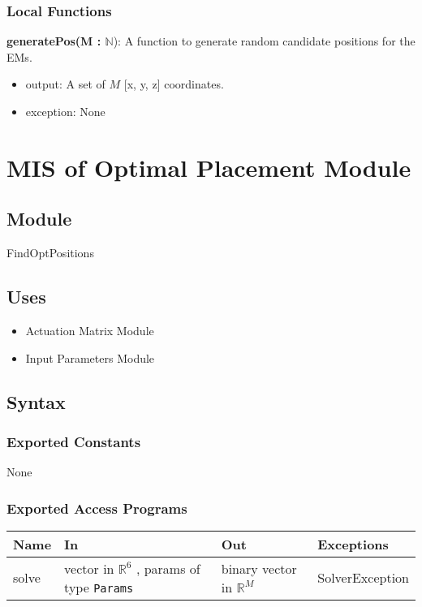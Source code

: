 \documentclass[12pt, titlepage]{article}
\begin{document}
\subsubsection{Local Functions}
\textbf{generatePos(M : $\mathbb{N}$}): A function to generate random candidate positions for the EMs. 
\begin{itemize}
  \item output: A set of $M$ [x, y, z] coordinates. 
  \item exception: None
\end{itemize}

\newpage


\section{MIS of Optimal Placement Module} \label{MISOptPlacement}

\subsection{Module}
FindOptPositions

\subsection{Uses}
\begin{itemize}
  \item Actuation Matrix Module 
  \item Input Parameters Module
\end{itemize}

\subsection{Syntax}

\subsubsection{Exported Constants}
None

\subsubsection{Exported Access Programs}

\begin{center}
  \begin{tabular}{p{3cm} p{4cm} p{4cm} p{3cm}}
  \hline
  \textbf{Name} & \textbf{In} & \textbf{Out} & \textbf{Exceptions} \\
  \hline
  solve & vector in $\mathbb{R}^6$ , params of type \texttt{Params} & binary vector in $\mathbb{R}^M$ & SolverException \\
  \hline
  \end{tabular}
  \end{center}
\end{document}

